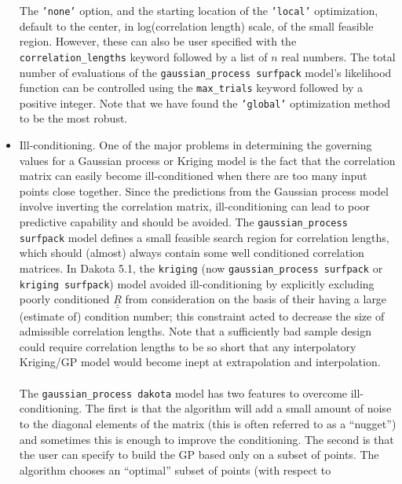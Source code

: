 \begin{itemize}
      The \texttt{'none'} option, and the starting location of the 
      \texttt{'local'} optimization, default to the center, in 
      log(correlation length) scale, of the small feasible region.  
      However, these can also be user specified with the 
      \texttt{correlation\_lengths} keyword followed by a list of $n$ real 
      numbers.  The total number of evaluations of the 
      \texttt{gaussian\_process surfpack} model's likelihood function can 
      be controlled using the \texttt{max\_trials} keyword followed by a 
      positive integer.  Note that we have found the \texttt{'global'} 
      optimization method to be the most robust.
\item Ill-conditioning.  One of the major problems in determining 
      the governing values for a Gaussian process or Kriging model is 
      the fact that the correlation matrix can easily become 
      ill-conditioned when there are too many input points close together.
      Since the predictions from the Gaussian process model involve 
      inverting the correlation matrix, ill-conditioning can lead to poor 
      predictive capability and should be avoided. The 
      \texttt{gaussian\_process surfpack} model defines a small feasible 
      search region for correlation lengths, which should (almost) always 
      contain some well conditioned correlation matrices. In Dakota 5.1, 
      the \texttt{kriging} (now \texttt{gaussian\_process surfpack} or
      \texttt{kriging surfpack}) model avoided 
      ill-conditioning by explicitly excluding poorly conditioned 
      $\underline{\underline{R}}$ from consideration on the basis of their 
      having a large (estimate of) condition number; this constraint acted 
      to decrease the size of admissible correlation lengths.  Note that a
      sufficiently bad sample design could require correlation lengths to 
      be so short that any interpolatory Kriging/GP model would become 
      inept at extrapolation and interpolation. \\ \\
      The \texttt{gaussian\_process dakota} model has two features to 
      overcome ill-conditioning.  The first is that the algorithm will 
      add a small amount of noise to the diagonal elements of the matrix 
      (this is often referred to as a ``nugget'') and sometimes this is 
      enough to improve the conditioning.  The second is that the user 
      can specify to build the GP based only on a subset of points.  The 
      algorithm chooses an ``optimal'' subset of points (with respect to 

\end{itemize}
